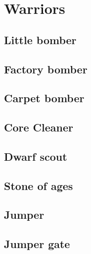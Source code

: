 \documentclass[11pt]{article}
\begin{document}
\newpage

\appendix
\section{Warriors}



\subsection{Little bomber}


\subsection{Factory bomber}


\subsection{Carpet bomber}


\newpage
\subsection{Core Cleaner}


\subsection{Dwarf scout}


\subsection{Stone of ages}



\newpage
\subsection{Jumper}


\subsection{Jumper gate}

\end{document}
